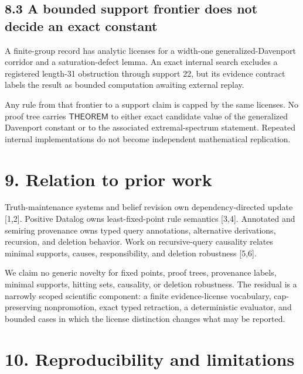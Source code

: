 \documentclass[
  11pt,
]{article}
\begin{document}
\hypertarget{a-bounded-support-frontier-does-not-decide-an-exact-constant}{%
\subsection{8.3 A bounded support frontier does not decide an exact
constant}\label{a-bounded-support-frontier-does-not-decide-an-exact-constant}}

A finite-group record has analytic licenses for a width-one
generalized-Davenport corridor and a saturation-defect lemma. An exact
internal search excludes a registered length-31 obstruction through
support 22, but its evidence contract labels the result as bounded
computation awaiting external replay.

Any rule from that frontier to a support claim is capped by the same
licenses. No proof tree carries \(\textsf{THEOREM}\) to either exact
candidate value of the generalized Davenport constant or to the
associated extremal-spectrum statement. Repeated internal
implementations do not become independent mathematical replication.

\hypertarget{relation-to-prior-work}{%
\section{9. Relation to prior work}\label{relation-to-prior-work}}

Truth-maintenance systems and belief revision own dependency-directed
update {[}1,2{]}. Positive Datalog owns least-fixed-point rule semantics
{[}3,4{]}. Annotated and semiring provenance owns typed query
annotations, alternative derivations, recursion, and deletion behavior.
Work on recursive-query causality relates minimal supports, causes,
responsibility, and deletion robustness {[}5,6{]}.

We claim no generic novelty for fixed points, proof trees, provenance
labels, minimal supports, hitting sets, causality, or deletion
robustness. The residual is a narrowly scoped scientific component: a
finite evidence-license vocabulary, cap-preserving nonpromotion, exact
typed retraction, a deterministic evaluator, and bounded cases in which
the license distinction changes what may be reported.

\hypertarget{reproducibility-and-limitations}{%
\section{10. Reproducibility and
limitations}\label{reproducibility-and-limitations}}
\end{document}
